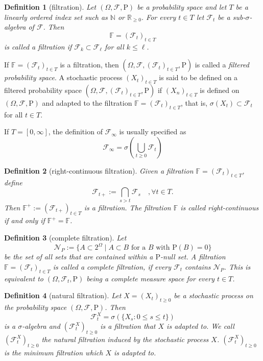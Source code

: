 \documentclass{article}
\newtheorem{definition}{Definition}[section]
\theoremstyle{nonumberplain}
\begin{document}
\begin{definition}[filtration]
Let $(\Omega,\mathcal{F},\mathrm{P})$ be a probability space and let $T$ be a linearly ordered index set such as $\mathbb{N}$ or $\mathbb{R}_{\ge 0}$. For every $t\in T$ let $\mathcal{F}_{t}$ be a sub-$\sigma$-algebra of $\mathcal{F}$. Then
\[
\mathbb{F} =(\mathcal{F}_{t})_{t\in T}
\]
is called a \emph{filtration} if $\mathcal {F}_{k}\subset \mathcal{F}_{\ell}$ for all $k\leq \ell$. 
\end{definition}
If $ \mathbb {F}=(\mathcal{F}_{t})_{t\in T }$ is a filtration, then $(\Omega,\mathcal{F},(\mathcal{F}_{t})_{t\in T },\mathrm{P})$ is called a \emph{filtered probability space}. A stochastic process $(X_{t})_{t\in T }$ is said to be defined on a filtered probability space $(\Omega,\mathcal{F},(\mathcal{F}_{t})_{t\in T },\mathrm{P})$ if $(X_{n})_{t\in T }$ is defined on $(\Omega,\mathcal{F},\mathrm{P})$ and adapted to the filtration $\mathbb{F} =(\mathcal{F}_{t})_{t\in T }$, that is, $\sigma(X_t)\subset \mathcal{F}_t$ for all $t\in T$. 

\noindent If $T=[0,\infty]$, the definition of $\mathcal{F}_{\infty}$ is usually specified as
\[
\mathcal{F}_{\infty}=\sigma\left(\bigcup_{t\ge0} \mathcal{F}_t\right)
\]

\begin{definition}[right-continuous filtration]
Given a filtration $\mathbb{F}=(\mathcal{F}_{t})_{t\in T}$, define
\[
\mathcal{F}_{t+}:=\bigcap_{s>t}\mathcal{F}_{s}\quad,\forall t\in T.
\]
Then $\mathbb{F}^+:=({\mathcal{F}}_{t+})_{t\in T}$ is a filtration. The filtration $\mathbb {F}$ is called \emph{right-continuous} if and only if $\mathbb{F}^{+}=\mathbb {F}$.
\end{definition}

\begin{definition}[complete filtration]
Let
\[\mathcal{N}_{P}:=\{A\subset 2^\Omega \mid A\subset B\text{ for a }B\text{ with }\mathrm{P}(B)=0\}
\]
be the set of all sets that are contained within a $\mathrm{P}$-null set. A filtration $\mathbb{F} =(\mathcal{F}_{t})_{t\in T}$ is called a \emph{complete filtration}, if every $\mathcal{F}_{t}$ contains $\mathcal{N}_{P}$. This is equivalent to $(\Omega,\mathcal{F}_{t},\mathrm{P})$ being a complete measure space for every $t\in T$.
\end{definition}

\begin{definition}[natural filtration]
	Let $X=(X_{t})_{t\ge 0}$ be a stochastic process on the probability space $(\Omega,\mathcal{F},\mathrm{P})$. Then 
	\[
	{\mathcal {F}}_{t}^X=\sigma (\{X_{s}:0\le s\le t\})
	\]
	is a $\sigma$-algebra and $(\mathcal {F}_{t}^X)_{t\ge0} $ is a filtration that $X$ is adapted to. We call $(\mathcal {F}_{t}^X)_{t\ge0} $ the \emph{natural filtration} induced by the stochastic process $X$. $(\mathcal {F}_{t}^X)_{t\ge0} $ is the minimum filtration which $X$ is adapted to.
\end{definition}
\end{document}

